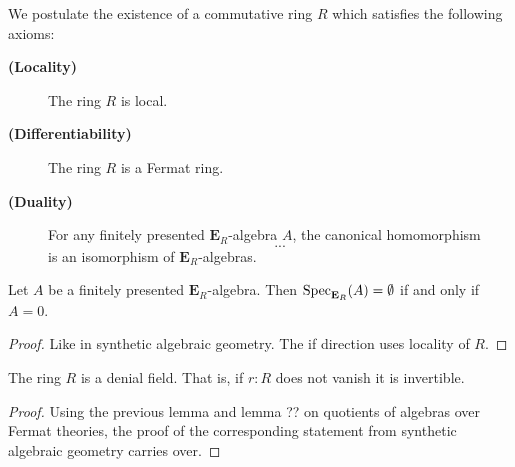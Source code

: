 {
\newcommand{\cat}[1]{\mathcal{#1}}
\newcommand{\theory}[1]{\mathbf{#1}}
\newcommand{\Psh}{\mathop{PSh}}
\newcommand{\Set}{\mathsf{Set}}
\newcommand{\TT}{\theory{T}}
\newcommand{\EE}{\theory{E}}
\newcommand{\Com}{\theory{Com}}
\newcommand{\diffquot}[2]{\frac{\Delta{#1}}{\Delta{#2}}}

We postulate the existence of a commutative ring \(R\) which satisfies the following axioms:
\begin{description}
  \item[\textbf{(Locality)}]
    The ring \(R\) is local.
  \item[\textbf{(Differentiability)}]
    The ring \(R\) is a Fermat ring.
  \item[\textbf{(Duality)}]
    For any finitely presented \(\EE_R\)-algebra \(A\), the canonical homomorphism
    \[...\]
    is an isomorphism of \(\EE_R\)-algebras.
\end{description}

\begin{lemma}
  Let \(A\) be a finitely presented \(\EE_R\)-algebra.
  Then \(\Spec_{\EE_R}(A)=\emptyset\) if and only if \(A=0\).
\end{lemma}
\begin{proof}
  Like in synthetic algebraic geometry.
  The if direction uses locality of \(R\).
\end{proof}

\begin{lemma}
  The ring \(R\) is a denial field. That is, if \(r:R\) does not vanish it is invertible.
\end{lemma}
\begin{proof}
  Using the previous lemma and lemma ?? on quotients of algebras over Fermat theories, the proof of the corresponding statement from synthetic algebraic geometry carries over.
\end{proof}

}
